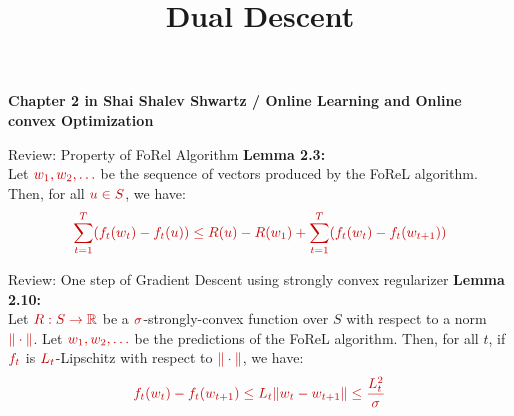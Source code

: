 \documentclass{beamer}
\title{Dual Descent}
\newcommand{\mathred}[1]{\textcolor{mathred}{#1}}
\begin{document}
\begin{small}

\begin{frame}
  \titlepage
{\bf Chapter 2 in Shai Shalev Shwartz / Online Learning and Online convex Optimization} 
\end{frame}

\begin{frame}{Review: Property of FoRel Algorithm}
\textbf{Lemma 2.3:}\\
Let $\mathred{w_1, w_2, \dots}$ be the sequence of vectors produced by the FoReL algorithm. Then, for all $\mathred{u \in S}$, we have:
\begin{equation*}
\mathred{\sum_{t=1}^{T} (f_t(w_t) - f_t(u)) \leq R(u) - R(w_1) + \sum_{t=1}^{T} (f_t(w_t) - f_t(w_{t+1}))}
\end{equation*}
\end{frame}

\begin{frame}{Review: One step of Gradient Descent using strongly convex regularizer}
\textbf{Lemma 2.10:}\\
Let $\mathred{R : S \to \mathbb{R}}$ be a $\mathred{\sigma}$-strongly-convex function over $S$ with respect to a norm $\mathred{\|\cdot\|}$. Let $\mathred{w_1, w_2, \dots}$ be the predictions of the FoReL algorithm. Then, for all $t$, if $\mathred{f_t}$ is $\mathred{L_t}$-Lipschitz with respect to $\mathred{\|\cdot\|}$, we have:
\begin{equation*}
\mathred{f_t(w_t) - f_t(w_{t+1}) \leq L_t \|w_t - w_{t+1}\| \leq \frac{L_t^2}{\sigma}}
\end{equation*}
\end{frame}


\end{small}
\end{document}
